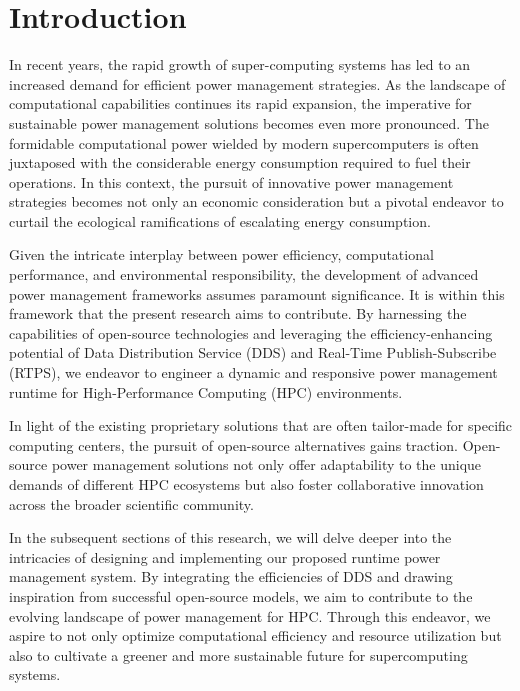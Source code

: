 


\section{Introduction}
In recent years, the rapid growth of super-computing systems has led to an increased demand for efficient power management strategies. As the landscape of computational capabilities continues its rapid expansion, the imperative for sustainable power management solutions becomes even more pronounced. The formidable computational power wielded by modern supercomputers is often juxtaposed with the considerable energy consumption required to fuel their operations. In this context, the pursuit of innovative power management strategies becomes not only an economic consideration but a pivotal endeavor to curtail the ecological ramifications of escalating energy consumption.

Given the intricate interplay between power efficiency, computational performance, and environmental responsibility, the development of advanced power management frameworks assumes paramount significance. It is within this framework that the present research aims to contribute. By harnessing the capabilities of open-source technologies and leveraging the efficiency-enhancing potential of Data Distribution Service (DDS) and Real-Time Publish-Subscribe (RTPS), we endeavor to engineer a dynamic and responsive power management runtime for High-Performance Computing (HPC) environments.

In light of the existing proprietary solutions that are often tailor-made for specific computing centers, the pursuit of open-source alternatives gains traction. Open-source power management solutions not only offer adaptability to the unique demands of different HPC ecosystems but also foster collaborative innovation across the broader scientific community.

In the subsequent sections of this research, we will delve deeper into the intricacies of designing and implementing our proposed runtime power management system. By integrating the efficiencies of DDS and drawing inspiration from successful open-source models, we aim to contribute to the evolving landscape of power management for HPC. Through this endeavor, we aspire to not only optimize computational efficiency and resource utilization but also to cultivate a greener and more sustainable future for supercomputing systems.%

